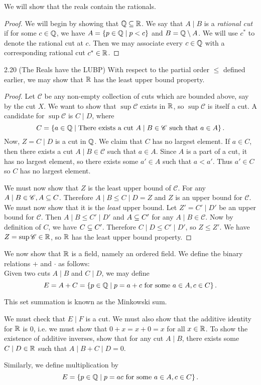 \documentclass[class=article, crop=false]{standalone}
\begin{document}
  We will show that the reals contain the rationals.
  \begin{proof}
    We will begin by showing that $\mathbb{Q}\subseteq\mathbb{R}$. We say that $A\mid B$ is a \emph{rational cut} if for some $c\in\mathbb{Q}$, we have $A = \left\{p\in\mathbb{Q}\mid p < c\right\}$ and $B = \mathbb{Q}\setminus A$. We will use $c^*$ to denote the rational cut at $c$. Then we may associate every $c\in\mathbb{Q}$ with a corresponding rational cut $c^*\in\mathbb{R}$.
  \end{proof}
  \begin{theorem}{2.20 (The Reals have the LUBP)}
    With respect to the partial order $\leq$ defined earlier, we may show that $\mathbb{R}$ has the least upper bound property.
    \begin{proof}
      Let $\mathscr{C}$ be any non-empty collection of cuts which are bounded above, say by the cut $X$. We want to show that $\sup \mathscr{C}$ exists in $\mathbb{R}$, so $\sup \mathscr{C}$ is itself a cut. A candidate for $\sup \mathscr{C}$ is $C\mid D$, where
      \[
        C = \left\{a\in\mathbb{Q}\mid \text{There exists a cut } A\mid B\in \mathscr{C} \text{ such that }a\in A\right\}.
      \]
      Now, $Z = C\mid D$ is a cut in $\mathbb{Q}$. We claim that $C$ has no largest element. If $a\in C$, then there exists a cut $A\mid B\in \mathscr{C}$ such that $a\in A$. Since $A$ is a part of a cut, it has no largest element, so there exists some $a'\in A$ such that $a < a'$. Thus $a'\in C$ so $C$ has no largest element. \par
      We must now show that $Z$ is the least upper bound of $\mathscr{C}$. For any $A\mid B\in \mathscr{C}, A\subseteq C$. Therefore $A\mid B\leq C\mid D = Z$ and $Z$ is an upper bound for $\mathscr{C}$. We must now show that it is the \emph{least} upper bound. Let $Z' = C'\mid D'$ be an upper bound for $\mathscr{C}$. Then $A\mid B\leq C'\mid D'$ and $A\subseteq C'$ for any $A\mid B\in \mathscr{C}$. Now by definition of $C$, we have $C\subseteq C'$. Therefore $C\mid D\leq C'\mid D'$, so $Z\leq Z'$. We have $Z = \sup \mathscr{C}\in \mathbb{R}$, so $\mathbb{R}$ has the least upper bound property.
    \end{proof}
  \end{theorem}
  We now show that $\mathbb{R}$ is a field, namely an ordered field. We define the binary relations $+$ and $\cdot$ as follows: \\
  Given two cuts $A\mid B$ and $C\mid D$, we may define
  \[
    E = A + C = \left\{p\in \mathbb{Q}\mid p = a + c \text{ for some }a\in A, c\in C\right\}.
  \]
  \begin{note}{}
    This set summation is known as the Minkowski sum.
  \end{note}
  We must check that $E\mid F$ is a cut. We must also show that the additive identity for $\mathbb{R}$ is $0$, i.e. we must show that $0 + x = x + 0 = x$ for all $x\in\mathbb{R}$. To show the existence of additive inverses, show that for any cut $A\mid B$, there exists some $C\mid D\in \mathbb{R}$ such that $A\mid B + C\mid D = 0$. \par
  Similarly, we define multiplication by
  \[
    E = \left\{p\in\mathbb{Q}\mid p = ac \text{ for some }a\in A, c\in C\right\}.
  \]
\end{document}
